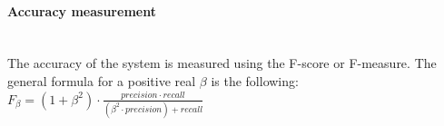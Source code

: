 



		\paragraph{Accuracy measurement}\mbox{}\\


		The accuracy of the system is measured using the F-score or F-measure. 
		The general formula for a positive real $\beta$ is the following: 
		\\

		$F_\beta=(1+\beta^2)\cdot\frac{precision \cdot recall}{(\beta^2 \cdot precision )+recall}$
		\\



		

